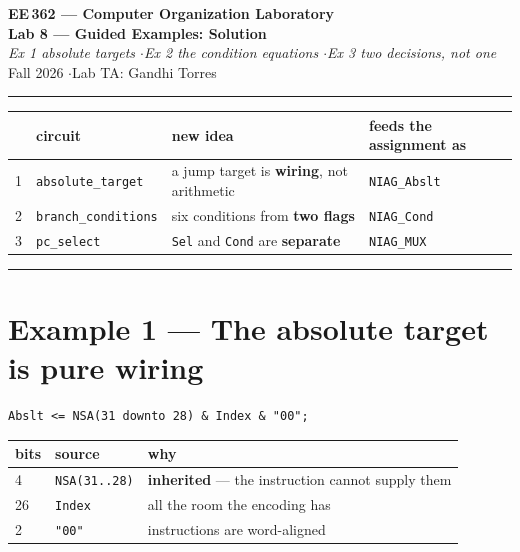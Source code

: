 \documentclass[11pt]{article}
\newcommand{\code}[1]{\texttt{#1}}
\newcommand{\hr}{\vspace{2pt}\hrule\vspace{6pt}}
\begin{document}
\begin{center}
{\Large\bfseries EE\,362 --- Computer Organization Laboratory}\\[2pt]
{\large\bfseries Lab 8 --- Guided Examples: Solution}\\[2pt]
{\itshape Ex 1 absolute targets \quad$\cdot$\quad Ex 2 the condition equations \quad$\cdot$\quad Ex 3 two decisions, not one}\\[4pt]
Fall 2026 \quad$\cdot$\quad Lab TA: Gandhi Torres
\end{center}
\hr

\begin{center}
\small
\begin{tabular}{cl>{\raggedright\arraybackslash}p{6.0cm}>{\raggedright\arraybackslash}p{3.8cm}}
\toprule
& circuit & new idea & feeds the assignment as \\
\midrule
1 & \code{absolute\_target} & a jump target is \textbf{wiring}, not arithmetic & \code{NIAG\_Abslt} \\
2 & \code{branch\_conditions} & six conditions from \textbf{two flags} & \code{NIAG\_Cond} \\
3 & \code{pc\_select} & \code{Sel} and \code{Cond} are \textbf{separate} & \code{NIAG\_MUX} \\
\bottomrule
\end{tabular}
\end{center}

\vspace{4pt}\hr

\section*{Example 1 --- The absolute target is pure wiring}

\begin{lstlisting}
Abslt <= NSA(31 downto 28) & Index & "00";
\end{lstlisting}

\begin{center}
\begin{tabular}{lll}
\toprule
bits & source & why \\
\midrule
4 & \code{NSA(31..28)} & \textbf{inherited} --- the instruction cannot supply them \\
26 & \code{Index} & all the room the encoding has \\
2 & \code{"00"} & instructions are word-aligned \\
\bottomrule
\end{tabular}
\end{center}
\end{document}
